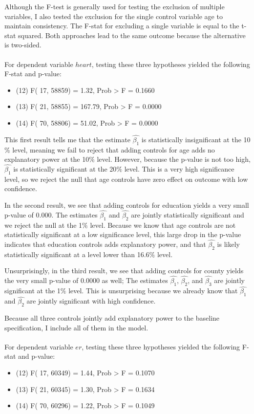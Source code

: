 \documentclass[a4paper]{article}
\begin{document}
Although the F-test is generally used for testing the exclusion of multiple variables, I also tested the exclusion for the single control variable age to maintain consistency. The F-stat for excluding a single variable is equal to the t-stat squared. Both approaches lead to the same outcome because the alternative is two-sided.
\\
\\
For dependent variable $heart$, testing these three hypotheses yielded the following F-stat and p-value:
\begin{itemize}
    \item (12) F( 17, 58859) = 1.32, Prob > F = 0.1660
    \item (13) F( 21, 58855) = 167.79, Prob > F = 0.0000
    \item (14) F( 70, 58806) = 51.02, Prob > F = 0.0000
\end{itemize}
This first result tells me that the estimate $\hat{\beta_1}$ is statistically insignificant at the 10$\%$ level, meaning we fail to reject that adding controls for age adds no explanatory power at the 10$\%$ level. However, because the p-value is not too high, $\hat{\beta_1}$ is statistically significant at the 20$\%$ level. This is a very high significance level, so we reject the null that age controls have zero effect on outcome with low confidence. 

In the second result, we see that adding controls for education yields a very small p-value of 0.000. The estimates $\hat{\beta_1}$ and $\hat{\beta_2}$ are jointly statistically significant and we reject the null at the 1$\%$ level. Because we know that age controls are not statistically significant at a low significance level, this large drop in the p-value indicates that education controls adds explanatory power, and that $\hat{\beta_2}$ is likely statistically significant at a level lower than 16.6$\%$ level.

Unsurprisingly, in the third result, we see that adding controls for county yields the very small p-value of 0.0000 as well; The estimates $\hat{\beta_1}$, $\hat{\beta_2}$, and $\hat{\beta_3}$ are jointly significant at the 1$\%$ level. This is unsurprising because we already know that $\hat{\beta_1}$ and $\hat{\beta_2}$ are jointly significant with high confidence.

Because all three controls jointly add explanatory power to the baseline specification, I include all of them in the model.\\
\\
For dependent variable $er$, testing these three hypotheses yielded the following F-stat and p-value:
\begin{itemize}
    \item (12) F( 17, 60349) = 1.44, Prob > F = 0.1070
    \item (13) F( 21, 60345) = 1.30, Prob > F = 0.1634
    \item (14) F( 70, 60296) = 1.22, Prob > F = 0.1049
\end{itemize}
\end{document}

